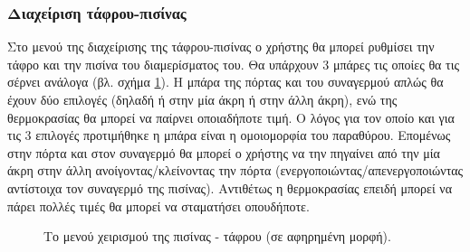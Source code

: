 \documentclass{assignment}
\begin{document}

\subsubsection{Διαχείριση τάφρου-πισίνας}

Στο μενού της διαχείρισης της τάφρου-πισίνας ο χρήστης θα μπορεί ρυθμίσει την τάφρο και την πισίνα του διαμερίσματος του. Θα υπάρχουν 3 μπάρες τις οποίες θα τις σέρνει ανάλογα (βλ. σχήμα \ref{fig:menu:pisina}). Η μπάρα της πόρτας και του συναγερμού απλώς θα έχουν δύο επιλογές (δηλαδή ή στην μία άκρη ή στην άλλη άκρη), ενώ της θερμοκρασίας θα μπορεί να παίρνει οποιαδήποτε τιμή. Ο λόγος για τον οποίο και για τις 3 επιλογές προτιμήθηκε η μπάρα είναι η ομοιομορφία του παραθύρου. Επομένως στην πόρτα και στον συναγερμό θα μπορεί ο χρήστης να την πηγαίνει από την μία άκρη στην άλλη ανοίγοντας/κλείνοντας την πόρτα (ενεργοποιώντας/απενεργοποιώντας αντίστοιχα τον συναγερμό της πισίνας). Αντιθέτως η θερμοκρασίας επειδή μπορεί να πάρει πολλές τιμές θα μπορεί να σταματήσει οπουδήποτε.

\begin{figure}
\begin{center}
\caption{Το μενού χειρισμού της πισίνας - τάφρου (σε αφηρημένη μορφή).}
\label{fig:menu:pisina}
\end{center}
\end{figure}
\end{document}
